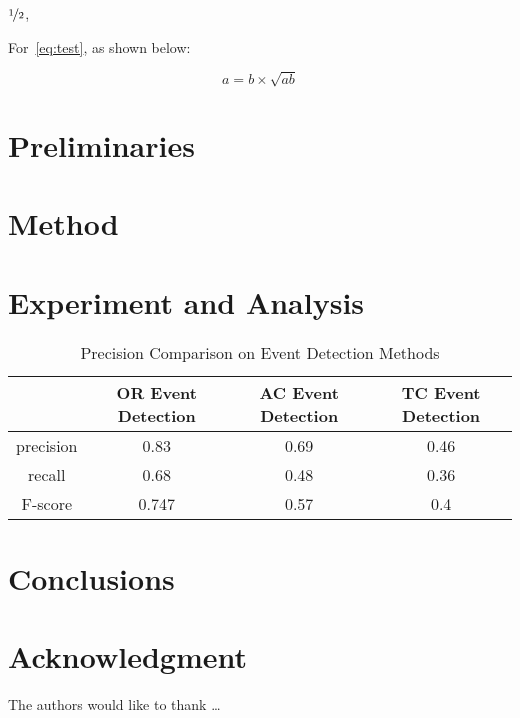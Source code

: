 \documentclass{amsart}
\theoremstyle{definition}
\theoremstyle{remark}
\numberwithin{equation}{section}
\begin{document}
$\nicefrac[]{1}{2}$,


For~\cref{eq:test},
as shown below:

\begin{equation}\label{eq:test}
a = b \times \sqrt{ab}
\end{equation}

\section{Preliminaries} \label{sec-preliminaries}

\lipsum


\section{Method} \label{sec-method}

\section{Experiment and Analysis} \label{sec-experiment}

\begin{table}  \centering
  \caption{Precision Comparison on Event Detection Methods}
  \label{tbl:overall-experiments}
  \begin{tabular}{cccc}
\toprule
    & OR Event Detection & AC Event Detection & TC Event Detection \\
\midrule
    precision & 0.83 & 0.69 & 0.46 \\
    recall & 0.68 & 0.48 & 0.36 \\
    F-score & 0.747 & 0.57 & 0.4 \\
\bottomrule
\end{tabular}
\end{table}

\section{Conclusions} \label{sec-conclusions}

\section*{Acknowledgment}

The authors would like to thank \ldots

\newpage


\end{document}
